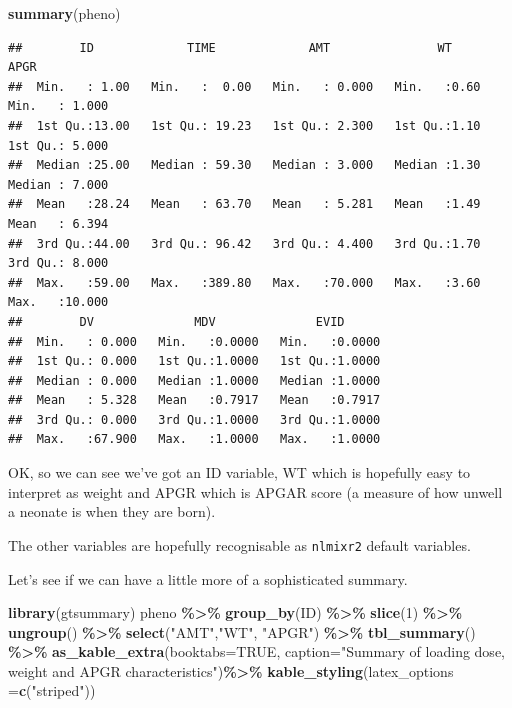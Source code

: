 \documentclass[
]{article}
\newenvironment{Shaded}{\begin{snugshade}}{\end{snugshade}}
\newcommand{\AttributeTok}[1]{\textcolor[rgb]{0.13,0.29,0.53}{#1}}
\newcommand{\ConstantTok}[1]{\textcolor[rgb]{0.56,0.35,0.01}{#1}}
\newcommand{\DecValTok}[1]{\textcolor[rgb]{0.00,0.00,0.81}{#1}}
\newcommand{\FunctionTok}[1]{\textcolor[rgb]{0.13,0.29,0.53}{\textbf{#1}}}
\newcommand{\NormalTok}[1]{#1}
\newcommand{\SpecialCharTok}[1]{\textcolor[rgb]{0.81,0.36,0.00}{\textbf{#1}}}
\newcommand{\StringTok}[1]{\textcolor[rgb]{0.31,0.60,0.02}{#1}}
\begin{document}
\begin{Shaded}
\begin{Highlighting}[]
\FunctionTok{summary}\NormalTok{(pheno)}
\end{Highlighting}
\end{Shaded}

\begin{verbatim}
##        ID             TIME             AMT               WT            APGR       
##  Min.   : 1.00   Min.   :  0.00   Min.   : 0.000   Min.   :0.60   Min.   : 1.000  
##  1st Qu.:13.00   1st Qu.: 19.23   1st Qu.: 2.300   1st Qu.:1.10   1st Qu.: 5.000  
##  Median :25.00   Median : 59.30   Median : 3.000   Median :1.30   Median : 7.000  
##  Mean   :28.24   Mean   : 63.70   Mean   : 5.281   Mean   :1.49   Mean   : 6.394  
##  3rd Qu.:44.00   3rd Qu.: 96.42   3rd Qu.: 4.400   3rd Qu.:1.70   3rd Qu.: 8.000  
##  Max.   :59.00   Max.   :389.80   Max.   :70.000   Max.   :3.60   Max.   :10.000  
##        DV              MDV              EVID       
##  Min.   : 0.000   Min.   :0.0000   Min.   :0.0000  
##  1st Qu.: 0.000   1st Qu.:1.0000   1st Qu.:1.0000  
##  Median : 0.000   Median :1.0000   Median :1.0000  
##  Mean   : 5.328   Mean   :0.7917   Mean   :0.7917  
##  3rd Qu.: 0.000   3rd Qu.:1.0000   3rd Qu.:1.0000  
##  Max.   :67.900   Max.   :1.0000   Max.   :1.0000
\end{verbatim}

OK, so we can see we've got an ID variable, WT which is hopefully easy to interpret as weight and APGR which is APGAR score (a measure of how unwell a neonate is when they are born).

The other variables are hopefully recognisable as \texttt{nlmixr2} default variables.

Let's see if we can have a little more of a sophisticated summary.

\begin{Shaded}
\begin{Highlighting}[]
\FunctionTok{library}\NormalTok{(gtsummary)}
\NormalTok{pheno }\SpecialCharTok{\%\textgreater{}\%} 
  \FunctionTok{group\_by}\NormalTok{(ID) }\SpecialCharTok{\%\textgreater{}\%} 
  \FunctionTok{slice}\NormalTok{(}\DecValTok{1}\NormalTok{) }\SpecialCharTok{\%\textgreater{}\%} 
  \FunctionTok{ungroup}\NormalTok{() }\SpecialCharTok{\%\textgreater{}\%} 
  \FunctionTok{select}\NormalTok{(}\StringTok{"AMT"}\NormalTok{,}\StringTok{"WT"}\NormalTok{, }\StringTok{"APGR"}\NormalTok{) }\SpecialCharTok{\%\textgreater{}\%} 
  \FunctionTok{tbl\_summary}\NormalTok{() }\SpecialCharTok{\%\textgreater{}\%} 
  \FunctionTok{as\_kable\_extra}\NormalTok{(}\AttributeTok{booktabs=}\ConstantTok{TRUE}\NormalTok{, }\AttributeTok{caption=}\StringTok{"Summary of loading dose, weight and APGR characteristics"}\NormalTok{)}\SpecialCharTok{\%\textgreater{}\%}
  \FunctionTok{kable\_styling}\NormalTok{(}\AttributeTok{latex\_options =}\FunctionTok{c}\NormalTok{(}\StringTok{"striped"}\NormalTok{))}
\end{Highlighting}
\end{Shaded}
\end{document}
